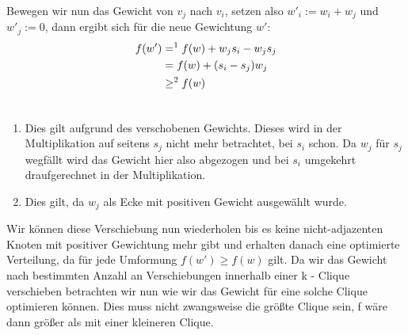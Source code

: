 \documentclass[12pt, a4paper]{article}
\begin{document}
Bewegen wir nun das Gewicht von $v_j$ nach $v_i$, setzen also $w'_i := w_i + w_j$ und $w'_j := 0$, dann ergibt sich für die neue Gewichtung $w'$:
\begin{gather}
\begin{split}f(w') &=^1 f(w) + w_j s_i - w_j s_j \\
&= f(w) + (s_i - s_j) w_j \\
&\ge^2 f(w)\end{split}\notag\\\begin{split}\end{split}\notag
\end{gather}\begin{enumerate}
\item {} 
Dies gilt aufgrund des verschobenen Gewichts. Dieses wird in der Multiplikation auf seitens $s_j$ nicht mehr betrachtet, bei $s_i$ schon. Da $w_j$ für $s_j$ wegfällt wird das Gewicht hier also abgezogen und bei $s_i$ umgekehrt draufgerechnet in der Multiplikation.

\item {} 
Dies gilt, da $w_j$ als Ecke mit positiven Gewicht ausgewählt wurde.

\end{enumerate}

Wir können diese Verschiebung nun wiederholen bis es keine nicht-adjazenten Knoten mit positiver Gewichtung mehr gibt und erhalten danach eine optimierte Verteilung, da für jede Umformung $f(w') \ge f(w)$ gilt. Da wir das Gewicht nach bestimmten Anzahl an Verschiebungen innerhalb einer k - Clique verschieben betrachten wir nun wie wir das Gewicht für eine solche Clique optimieren können.
Dies muss nicht zwangsweise die größte Clique sein, f wäre dann größer als mit einer kleineren Clique.
\end{document}
